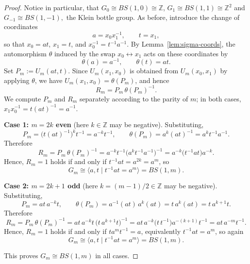\documentclass[10pt,a4paper]{amsart}
\begin{document}
\begin{proof}
Notice in particular, that $G_0\cong BS(1,0)\cong\mathbb{Z}$, $G_1\cong BS(1,1)\cong\mathbb{Z}^2$ and $G_{-1}\cong BS(1,-1),$ the Klein bottle group. As before, introduce the change of coordinates
\[
a = x_0 x_1^{-1}, \qquad t = x_1,
\]
so that $x_0 = at$, $x_1 = t$, and $x_0^{-1} = t^{-1}a^{-1}$. By Lemma~\ref{lem:sigma-coords}, the automorphism $\theta$ induced by the swap $x_0 \leftrightarrow x_1$ acts on these coordinates by
\[
\theta(a) = a^{-1}, \qquad \theta(t) = at.
\]
Set $P_m := U_m(at,t)$. Since $U_m(x_1,x_0)$ is obtained from $U_m(x_0,x_1)$ by applying $\theta$, we have $U_m(x_1,x_0) = \theta(P_m)$, and hence
\[
R_m = P_m\,\theta(P_m)^{-1}.
\]
We compute $P_m$ and $R_m$ separately according to the parity of $m$; in both cases, $x_1 x_0^{-1} = t(at)^{-1} = a^{-1}$.

\smallskip
\noindent\textbf{Case 1: $m = 2k$ even} (here $k \in \mathbb{Z}$ may be negative). Substituting,
\[
P_m = \bigl(t(at)^{-1}\bigr)^k t^{-1} = a^{-k} t^{-1}, \qquad
\theta(P_m) = a^{k}(at)^{-1} = a^{k} t^{-1} a^{-1}.
\]
Therefore
\[
R_m = P_m\,\theta(P_m)^{-1}
= a^{-k}t^{-1}\bigl(a^{k}t^{-1}a^{-1}\bigr)^{-1}
= a^{-k}\bigl(t^{-1}at\bigr)a^{-k}.
\]
Hence,  $R_m = 1$ holds if and only if $t^{-1}at = a^{2k} = a^m$, so
\[
G_m \cong \langle a, t \mid t^{-1}at = a^m \rangle = BS(1,m).
\]

\smallskip
\noindent\textbf{Case 2: $m = 2k+1$ odd} (here $k = (m-1)/2 \in \mathbb{Z}$ may be negative). Substituting,
\[
P_m = at\,a^{-k}t, \qquad
\theta(P_m) = a^{-1}(at)\,a^{k}(at) = t\,a^{k}(at) = t\,a^{k+1}t.
\]
Therefore
\[
R_m = P_m\,\theta(P_m)^{-1}
= at\,a^{-k}t\,\bigl(t\,a^{k+1}t\bigr)^{-1}
= at\,a^{-k}\bigl(t\,t^{-1}\bigr)a^{-(k+1)}t^{-1}
= at\,a^{-m}t^{-1}.
\]
Hence,  $R_m = 1$ holds if and only if $t a^m t^{-1} = a$, equivalently $t^{-1}at = a^m$, so again
\[
G_m \cong \langle a, t \mid t^{-1}at = a^m \rangle = BS(1,m).
\]

\smallskip
This proves $G_m \cong BS(1,m)$ in all cases. 
\end{proof}
\end{document}
